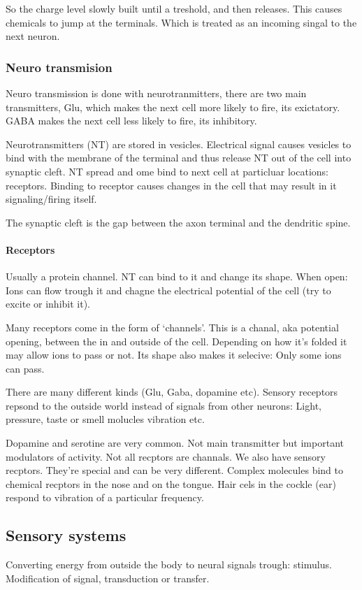 \documentclass{article}
\begin{document}
So the charge level slowly built until a treshold, and then releases. This
causes chemicals to jump at the terminals. Which is treated as an incoming
singal to the next neuron.

\subsubsection{Neuro transmision}
Neuro transmission is done with neurotranmitters, there are two main
transmitters, Glu, which makes the next cell more likely to fire, its
exictatory. GABA makes the next cell less likely to fire, its inhibitory.

Neurotransmitters (NT) are stored in vesicles. Electrical signal causes
vesicles to bind with the membrane of the terminal and thus release NT
out of the cell into synaptic cleft. NT spread and ome bind to next
cell at particluar locations: receptors. Binding to receptor causes
changes in the cell that may result in it signaling/firing itself.

The synaptic cleft is the gap between the axon terminal and
the dendritic spine.

\paragraph{Receptors} Usually a protein channel. NT can bind to it
and change its shape. When open: Ions can flow trough it and
chagne the electrical potential of the cell (try to excite or
inhibit it).

Many receptors come in the form of `channels'. This is a chanal,
aka potential opening, between the in and outside of the cell.
Depending on how it's folded it may allow ions to pass or not.
Its shape also makes it selecive: Only some ions can pass.

There are many different kinds (Glu, Gaba, dopamine etc).
Sensory receptors repsond to the outside world instead of signals
from other neurons: Light, pressure, taste or smell molucles vibration etc.

Dopamine and serotine are very common. Not main transmitter but important
modulators of activity. Not all recptors are channals. We also have sensory
recptors. They're special and can be very different. Complex molecules bind
to chemical recptors in the nose and on the tongue. Hair cels in the cockle
(ear) respond to vibration of a particular frequency.

\subsection{Sensory systems}
Converting energy from outside the body to neural signals trough: stimulus.
Modification of signal, transduction or transfer.
\end{document}
